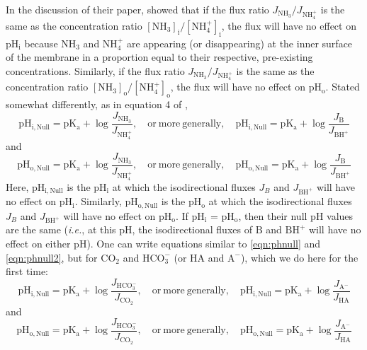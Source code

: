 \documentclass[fleqn,10pt]{physiome}
\begin{document}
In the discussion of their paper, \cite{musa2009concentration} showed that if the flux ratio $J_\mathrm{NH_3}/J_\mathrm{NH_4^+}$ is the same as the concentration ratio $\mathrm{[NH_3]_i}/\mathrm{[NH_4^+]_i}$, the flux will have no effect on $\mathrm{pH_i}$ because $\mathrm{NH_3}$ and $\mathrm{NH_4^+}$ are appearing (or disappearing) at the inner surface of the membrane in a proportion equal to their respective, pre-existing concentrations. Similarly, if the flux ratio $J_\mathrm{NH_3}/J_\mathrm{NH_4^+}$ is the same as the concentration ratio $\mathrm{[NH_3]_o}/\mathrm{[NH_4^+]_o}$, the flux will have no effect on $\mathrm{pH_o}$. Stated somewhat differently, as in equation 4 of \cite{musa2009concentration},
\begin{equation}
\mathrm{pH_{i,Null}}=\mathrm{pK_a}+\log \dfrac{J_\mathrm{NH_3}}{J_\mathrm{NH_4^+}},\quad \mathrm{or~ more~ generally},\quad \mathrm{pH_{i,Null}}=\mathrm{pK_a}+\log \dfrac{J_\mathrm{B}}{J_\mathrm{BH^+}}
\label{eqn:phnull}
\end{equation}
and
\begin{equation}
\mathrm{pH_{o,Null}}=\mathrm{pK_a}+\log \dfrac{J_\mathrm{NH_3}}{J_\mathrm{NH_4^+}},\quad \mathrm{or~ more~ generally},\quad \mathrm{pH_{o,Null}}=\mathrm{pK_a}+\log \dfrac{J_\mathrm{B}}{J_\mathrm{BH^+}}
\label{eqn:phnull2}
\end{equation}
Here, $\mathrm{pH_{i,Null}}$ is the $\mathrm{pH_i}$ at which the isodirectional fluxes $J_B$ and $J_\mathrm{BH^+}$ will have no effect on $\mathrm{pH_i}$. Similarly, $\mathrm{pH_{o,Null}}$ is the $\mathrm{pH_o}$ at which the isodirectional fluxes $J_B$ and $J_\mathrm{BH^+}$ will have no effect on $\mathrm{pH_o}$. If $\mathrm{pH_i}$ = $\mathrm{pH_o}$, then their null $\mathrm{pH}$ values are the same (\emph{i.e.}, at this $\mathrm{pH}$, the isodirectional fluxes of $\mathrm{B}$ and $\mathrm{BH^+}$ will have no effect on either $\mathrm{pH}$). One can write equations similar to \autoref{eqn:phnull} and \autoref{eqn:phnull2}, but for $\mathrm{CO_2}$ and $\mathrm{HCO_3^-}$ (or $\mathrm{HA}$ and $\mathrm{A^-}$), which we do here for the first time:
\begin{equation}
\mathrm{pH_{i,Null}}=\mathrm{pK_a}+\log \dfrac{J_\mathrm{HCO_3^-}}{J_\mathrm{CO_2}},\quad \mathrm{or~ more~ generally},\quad \mathrm{pH_{i,Null}}=\mathrm{pK_a}+\log \dfrac{J_\mathrm{A^-}}{J_\mathrm{HA}}
\label{eqn:phnull3}
\end{equation}
and
\begin{equation}
\mathrm{pH_{o,Null}}=\mathrm{pK_a}+\log \dfrac{J_\mathrm{HCO_3^-}}{J_\mathrm{CO_2}},\quad \mathrm{or~ more~ generally},\quad \mathrm{pH_{o,Null}}=\mathrm{pK_a}+\log \dfrac{J_\mathrm{A^-}}{J_\mathrm{HA}}
\label{eqn:phnull4}
\end{equation}
\end{document}
